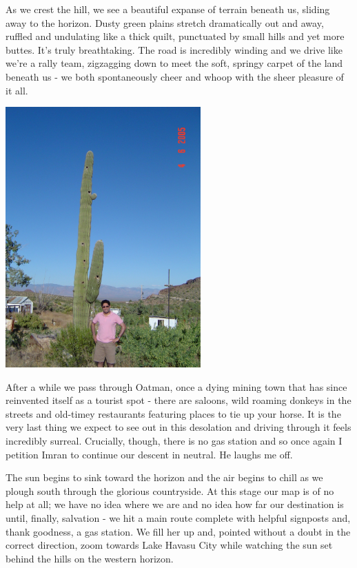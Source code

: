 \documentclass[a5paper,titlepage,11pt]{book}
\begin{document}
As we crest the hill, we see a beautiful expanse of terrain beneath us, sliding away to the horizon.  Dusty green plains stretch dramatically out and away, ruffled and undulating like a thick quilt, punctuated by small hills and yet more buttes.  It's truly breathtaking.  The road is incredibly winding and we drive like we're a rally team, zigzagging down to meet the soft, springy carpet of the land beneath us - we both spontaneously cheer and whoop with the sheer pleasure of it all.

\begin{center}\includegraphics[height=100mm]{gfx/DSC00701}\end{center}

After a while we pass through Oatman, once a dying mining town that has since reinvented itself as a tourist spot - there are saloons, wild roaming donkeys in the streets and old-timey restaurants featuring places to tie up your horse.  It is the very last thing we expect to see out in this desolation and driving through it feels incredibly surreal.  Crucially, though, there is no gas station and so once again I petition Imran to continue our descent in neutral.  He laughs me off.

The sun begins to sink toward the horizon and the air begins to chill as we plough south through the glorious countryside.  At this stage our map is of no help at all; we have no idea where we are and no idea how far our destination is until, finally, salvation - we hit a main route complete with helpful signposts and, thank goodness, a gas station.  We fill her up and, pointed without a doubt in the correct direction, zoom towards Lake Havasu City while watching the sun set behind the hills on the western horizon.
\end{document}
